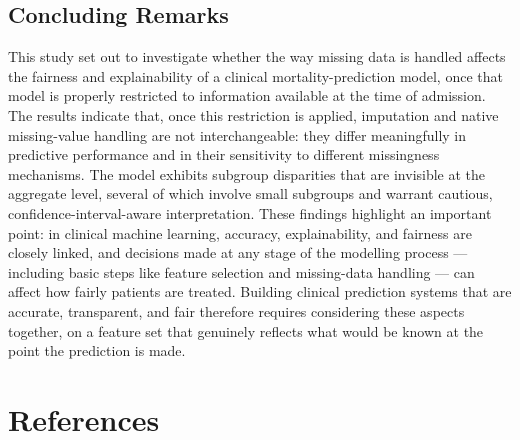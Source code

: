 \documentclass[12pt,a4paper]{report}
\begin{document}
\section{Concluding Remarks}
This study set out to investigate whether the way missing data is handled affects the fairness and explainability of a clinical mortality-prediction model, once that model is properly restricted to information available at the time of admission. The results indicate that, once this restriction is applied, imputation and native missing-value handling are not interchangeable: they differ meaningfully in predictive performance and in their sensitivity to different missingness mechanisms. The model exhibits subgroup disparities that are invisible at the aggregate level, several of which involve small subgroups and warrant cautious, confidence-interval-aware interpretation. These findings highlight an important point: in clinical machine learning, accuracy, explainability, and fairness are closely linked, and decisions made at any stage of the modelling process --- including basic steps like feature selection and missing-data handling --- can affect how fairly patients are treated. Building clinical prediction systems that are accurate, transparent, and fair therefore requires considering these aspects together, on a feature set that genuinely reflects what would be known at the point the prediction is made.


\chapter*{References}
\end{document}
